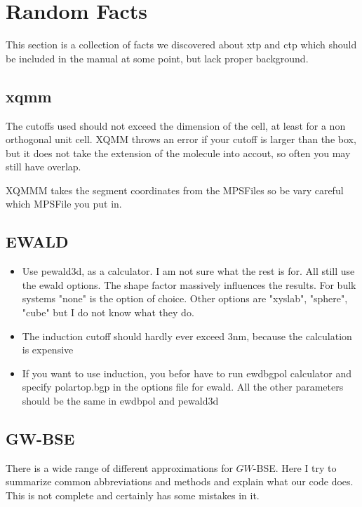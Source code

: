 \section{Random Facts}

This section is a collection of facts we discovered about xtp and ctp which 
should be included in the manual at some point, but lack proper background.



\subsection{xqmm}

The cutoffs used should not exceed the dimension of the cell, at least for a non 
orthogonal unit cell. XQMM throws an error if your cutoff is larger than the 
box, but it does not take the extension of the molecule into accout, so often 
you may still have overlap.

XQMMM takes the segment coordinates from the MPS\textunderscore Files so be vary 
careful which MPS\textunderscore File you put in.


\subsection{EWALD}


\begin{itemize}
\item Use pewald3d, as a calculator. I am not sure what the rest is for. All 
still use the ewald options. The shape factor massively influences the results. 
For bulk systems "none" is the option of choice. Other options are "xyslab", 
"sphere", "cube" but I do not know what they do.
\item The induction cutoff should hardly ever exceed 3nm, because the 
calculation is expensive
\item If you want to use induction, you befor have to run ewdbgpol calculator 
and specify polar\textunderscore top.bgp in the options file for ewald. All the 
other parameters should be the same in ewdbpol and pewald3d
\end{itemize}

\subsection{GW-BSE}

There is a wide range of different approximations for $GW$-BSE. Here I try to 
summarize common abbreviations and methods and explain what our code does. This 
is not complete and certainly has some mistakes in it. 



